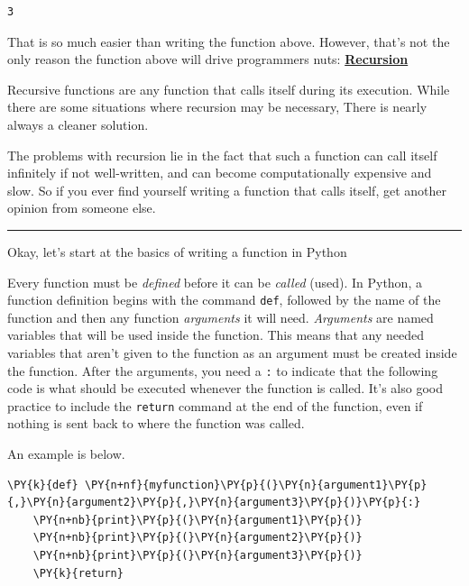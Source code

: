             \begin{tcolorbox}[breakable, size=fbox, boxrule=.5pt, pad at break*=1mm, opacityfill=0]
\begin{Verbatim}[commandchars=\\\{\}]
3
\end{Verbatim}
\end{tcolorbox}
        
    That is so much easier than writing the function above. However, that's
not the only reason the function above will drive programmers nuts:
\textbf{\href{https://www.google.com/search?biw=924\&bih=939\&sxsrf=ALiCzsYF5yDBRHIPvQK0WvoahmOQWNTLaw:1652715574983\&q=recursion\&spell=1\&sa=X\&ved=2ahUKEwjhw4umreT3AhVBCjQIHQeACCYQBSgAegQIAhAy}{Recursion}}

Recursive functions are any function that calls itself during its
execution. While there are some situations where recursion may be
necessary, There is nearly always a cleaner solution.

The problems with recursion lie in the fact that such a function can
call itself infinitely if not well-written, and can become
computationally expensive and slow. So if you ever find yourself writing
a function that calls itself, get another opinion from someone else.

\begin{center}\rule{0.5\linewidth}{0.5pt}\end{center}

Okay, let's start at the basics of writing a function in Python

Every function must be \emph{defined} before it can be \emph{called}
(used). In Python, a function definition begins with the command
\texttt{def}, followed by the name of the function and then any function
\emph{arguments} it will need. \emph{Arguments} are named variables that
will be used inside the function. This means that any needed variables
that aren't given to the function as an argument must be created inside
the function. After the arguments, you need a \texttt{:} to indicate
that the following code is what should be executed whenever the function
is called. It's also good practice to include the \texttt{return}
command at the end of the function, even if nothing is sent back to
where the function was called.

An example is below.

    \begin{tcolorbox}[breakable, size=fbox, boxrule=1pt, pad at break*=1mm,colback=cellbackground, colframe=cellborder]
\begin{Verbatim}[commandchars=\\\{\}]
\PY{k}{def} \PY{n+nf}{myfunction}\PY{p}{(}\PY{n}{argument1}\PY{p}{,}\PY{n}{argument2}\PY{p}{,}\PY{n}{argument3}\PY{p}{)}\PY{p}{:}
    \PY{n+nb}{print}\PY{p}{(}\PY{n}{argument1}\PY{p}{)}
    \PY{n+nb}{print}\PY{p}{(}\PY{n}{argument2}\PY{p}{)}
    \PY{n+nb}{print}\PY{p}{(}\PY{n}{argument3}\PY{p}{)}
    \PY{k}{return}
\end{Verbatim}
\end{tcolorbox}

